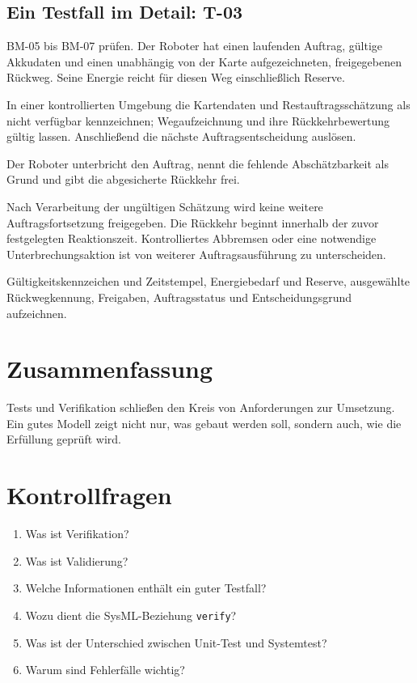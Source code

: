 \subsection{Ein Testfall im Detail: T-03}
\begin{description}[style=nextline]
    \item[Ziel und Vorbedingungen] BM-05 bis BM-07 prüfen. Der Roboter hat einen laufenden Auftrag, gültige Akkudaten und einen unabhängig von der Karte aufgezeichneten, freigegebenen Rückweg. Seine Energie reicht für diesen Weg einschließlich Reserve.
    \item[Testaufbau und Ablauf] In einer kontrollierten Umgebung die Kartendaten und Restauftragsschätzung als nicht verfügbar kennzeichnen; Wegaufzeichnung und ihre Rückkehrbewertung gültig lassen. Anschließend die nächste Auftragsentscheidung auslösen.
    \item[Erwartetes Ergebnis] Der Roboter unterbricht den Auftrag, nennt die fehlende Abschätzbarkeit als Grund und gibt die abgesicherte Rückkehr frei.
    \item[Bewertungskriterium] Nach Verarbeitung der ungültigen Schätzung wird keine weitere Auftragsfortsetzung freigegeben. Die Rückkehr beginnt innerhalb der zuvor festgelegten Reaktionszeit. Kontrolliertes Abbremsen oder eine notwendige Unterbrechungsaktion ist von weiterer Auftragsausführung zu unterscheiden.
    \item[Messdaten] Gültigkeitskennzeichen und Zeitstempel, Energiebedarf und Reserve, ausgewählte Rückwegkennung, Freigaben, Auftragsstatus und Entscheidungsgrund aufzeichnen.
\end{description}

\section{Zusammenfassung}
Tests und Verifikation schließen den Kreis von Anforderungen zur Umsetzung. Ein gutes Modell zeigt nicht nur, was gebaut werden soll, sondern auch, wie die Erfüllung geprüft wird.

\section{Kontrollfragen}
\begin{enumerate}
    \item Was ist Verifikation?
    \item Was ist Validierung?
    \item Welche Informationen enthält ein guter Testfall?
    \item Wozu dient die SysML-Beziehung \texttt{verify}?
    \item Was ist der Unterschied zwischen Unit-Test und Systemtest?
    \item Warum sind Fehlerfälle wichtig?
\end{enumerate}

